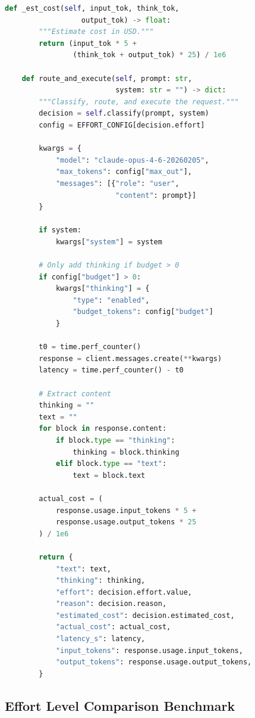 \documentclass[11pt,a4paper]{article}
\begin{document}
\begin{lstlisting}[language=Python, caption={Production Fast Mode Router with Cost Tracking}]
    def _est_cost(self, input_tok, think_tok, 
                  output_tok) -> float:
        """Estimate cost in USD."""
        return (input_tok * 5 + 
                (think_tok + output_tok) * 25) / 1e6
    
    def route_and_execute(self, prompt: str, 
                          system: str = "") -> dict:
        """Classify, route, and execute the request."""
        decision = self.classify(prompt, system)
        config = EFFORT_CONFIG[decision.effort]
        
        kwargs = {
            "model": "claude-opus-4-6-20260205",
            "max_tokens": config["max_out"],
            "messages": [{"role": "user", 
                          "content": prompt}]
        }
        
        if system:
            kwargs["system"] = system
        
        # Only add thinking if budget > 0
        if config["budget"] > 0:
            kwargs["thinking"] = {
                "type": "enabled",
                "budget_tokens": config["budget"]
            }
        
        t0 = time.perf_counter()
        response = client.messages.create(**kwargs)
        latency = time.perf_counter() - t0
        
        # Extract content
        thinking = ""
        text = ""
        for block in response.content:
            if block.type == "thinking":
                thinking = block.thinking
            elif block.type == "text":
                text = block.text
        
        actual_cost = (
            response.usage.input_tokens * 5 +
            response.usage.output_tokens * 25
        ) / 1e6
        
        return {
            "text": text,
            "thinking": thinking,
            "effort": decision.effort.value,
            "reason": decision.reason,
            "estimated_cost": decision.estimated_cost,
            "actual_cost": actual_cost,
            "latency_s": latency,
            "input_tokens": response.usage.input_tokens,
            "output_tokens": response.usage.output_tokens,
        }
\end{lstlisting}

\subsection{Effort Level Comparison Benchmark}
\end{document}
